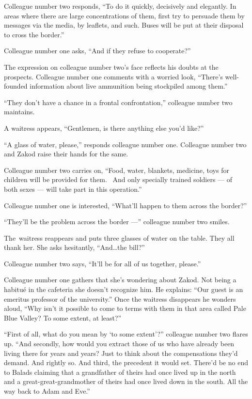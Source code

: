\documentclass[twoside,11pt,openany]{book}
\begin{document}
Colleague number two responds, ``To do it quickly, decisively and elegantly. In areas where there are large
concentrations of them, first try to persuade them by messages via the media, by leaflets, and such. Buses will be put
at their disposal to cross the border.''

Colleague number one asks, ``And if they refuse to cooperate?''

The expression on colleague number two's face reflects his doubts at the prospects. Colleague number one comments with a
worried look, ``There's well-founded information about live ammunition being
stockpiled among them.''

``They don't have a chance in a frontal confrontation,'' colleague number two maintains.

A waitress appears, ``Gentlemen, is there anything else you'd like?''

``A glass of water, please,'' responds colleague number one. Colleague number two and Zakod
raise their hands for the same.

Colleague number two carries on, ``Food, water, blankets, medicine, toys for children will be provided for
them. ~And only specially trained soldiers --- of both sexes --- will take part in this operation.''

Colleague number one is interested, ``What'll happen to them across the border?''

``They'll be the problem across the border ---'' colleague number two smiles.

The~waitress reappears and puts three glasses of water on the table. They all thank her. She asks hesitantly,
``And{\ldots}the bill?''

Colleague number two says, ``It'll be for all of us together, please.''

Colleague number one gathers that she's wondering about Zakod. Not being a habitu\'e in the cafeteria she doesn't
recognize him. He explains: ``Our guest is an emeritus professor of the university.'' Once
the waitress disappears he wonders aloud, ``Why isn't it possible to come to terms with them in that area
called Pale Blue Valley? To some extent, at least?''

``First of all, what do you mean by `to some extent'?'' colleague number two flares up.
``And secondly, how would you extract those of us who have already been living there for years and years?
Just to think about the compensations they'd demand. And rightly so. And third, the precedent it would set. There'd be
no end to Balads claiming that a grandfather of theirs had once lived up in the north and a great-great-grandmother of
theirs had once lived down in the south. All the way back to Adam and Eve.''
\end{document}
